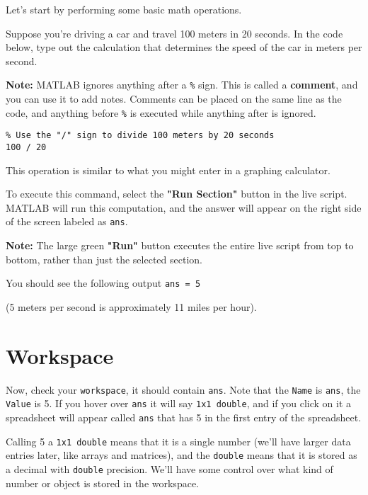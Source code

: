 \documentclass{ximera}
\begin{document}
Let's start by performing some basic math operations. 

\begin{example}
Suppose you're driving a car and travel 100 meters in 20 seconds.
In the code below, type out the calculation that determines the speed of the car in meters per second.

\begin{remark}
\textbf{Note:} MATLAB ignores anything after a \texttt{\%} sign. This is called a \textbf{comment}, and you can use it to add notes. 
Comments can be placed on the same line as the code, and anything before \texttt{\%} is executed while anything after is ignored.
\end{remark}

\begin{verbatim}
% Use the "/" sign to divide 100 meters by 20 seconds
100 / 20
\end{verbatim}

This operation is similar to what you might enter in a graphing calculator.

To execute this command, select the \textbf{"Run Section"} button in the live script. MATLAB will run this computation, 
and the answer will appear on the right side of the screen labeled as \texttt{ans}.

\begin{remark}
\textbf{Note:} The large green \textbf{"Run"} button executes the entire live script from top to bottom, rather than just the selected section.
\end{remark}

You should see the following output \texttt{ans = 5}

(5 meters per second is approximately 11 miles per hour).
\end{example}

\section*{Workspace}
Now, check your \texttt{workspace}, it should contain \texttt{ans}. Note that the \texttt{Name} is \texttt{ans}, the \texttt{Value} is 5. If you hover over \texttt{ans} it will say \texttt{1x1 double}, and if you click on it a spreadsheet will appear called \texttt{ans} that has 5 in the first entry of the spreadsheet.

Calling 5 a \texttt{1x1 double} means that it is a single number (we'll have larger data entries later, like arrays and matrices), and the \texttt{double} means that it is stored as a decimal with \texttt{double} precision. We'll have some control over what kind of number or object is stored in the workspace.
\end{document}
